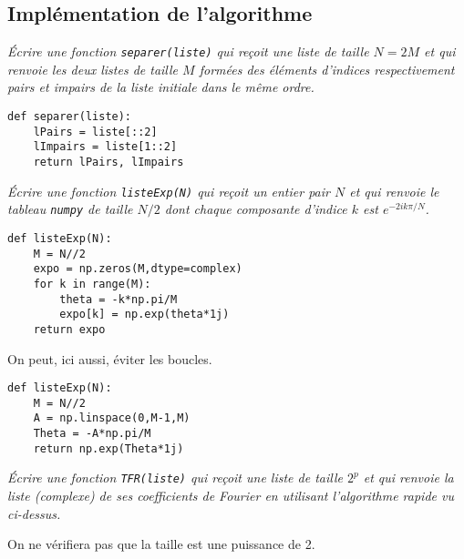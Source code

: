 \subsection{Implémentation de l'algorithme}
\begin{Exercise}\it Écrire une fonction {\tt separer(liste)} qui reçoit une liste de taille $N=2M$ et qui renvoie les deux listes de taille $M$ formées des éléments d'indices respectivement pairs et impairs de la liste initiale dans le même ordre.
\end{Exercise}
\begin{Answer}
\begin{lstlisting}
def separer(liste):
    lPairs = liste[::2]
    lImpairs = liste[1::2]
    return lPairs, lImpairs
\end{lstlisting}
\end{Answer}
\begin{Exercise}\it 
Écrire une fonction {\tt listeExp(N)} qui reçoit un entier pair $N$ et qui renvoie le tableau {\tt numpy} de taille $N/2$ dont chaque composante d'indice $k$ est $e^{-2ik\pi/N}$.
\end{Exercise}
\begin{Answer}
\begin{lstlisting}
def listeExp(N):
    M = N//2
    expo = np.zeros(M,dtype=complex)
    for k in range(M):
        theta = -k*np.pi/M
        expo[k] = np.exp(theta*1j)
    return expo
\end{lstlisting}
On peut, ici aussi, éviter les boucles.
\begin{lstlisting}
def listeExp(N):
    M = N//2
    A = np.linspace(0,M-1,M)
    Theta = -A*np.pi/M
    return np.exp(Theta*1j)
\end{lstlisting}
\end{Answer}
\begin{Exercise}\it Écrire une fonction {\tt TFR(liste)} qui reçoit une liste de taille $2^p$ et qui renvoie la liste (complexe) de ses coefficients de Fourier en utilisant l'algorithme rapide vu ci-dessus.

On ne vérifiera pas que la taille est une puissance de 2.
\end{Exercise}
